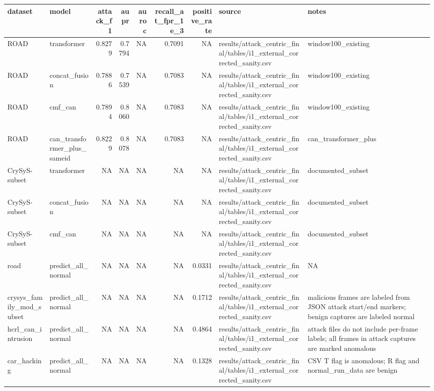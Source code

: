 \begin{tabular}{llrrrrrll}
\toprule
dataset & model & attack\_f1 & aupr & auroc & recall\_at\_fpr\_1e\_3 & positive\_rate & source & notes \\
\midrule
ROAD & transformer & 0.8279 & 0.7794 & NA & 0.7091 & NA & results/attack\_centric\_final/tables/i1\_external\_corrected\_sanity.csv & window100\_existing \\
ROAD & concat\_fusion & 0.7886 & 0.7539 & NA & 0.7083 & NA & results/attack\_centric\_final/tables/i1\_external\_corrected\_sanity.csv & window100\_existing \\
ROAD & cmf\_can & 0.7894 & 0.8060 & NA & 0.7083 & NA & results/attack\_centric\_final/tables/i1\_external\_corrected\_sanity.csv & window100\_existing \\
ROAD & can\_transformer\_plus\_sameid & 0.8229 & 0.8078 & NA & 0.7083 & NA & results/attack\_centric\_final/tables/i1\_external\_corrected\_sanity.csv & can\_transformer\_plus \\
CrySyS-subset & transformer & NA & NA & NA & NA & NA & results/attack\_centric\_final/tables/i1\_external\_corrected\_sanity.csv & documented\_subset \\
CrySyS-subset & concat\_fusion & NA & NA & NA & NA & NA & results/attack\_centric\_final/tables/i1\_external\_corrected\_sanity.csv & documented\_subset \\
CrySyS-subset & cmf\_can & NA & NA & NA & NA & NA & results/attack\_centric\_final/tables/i1\_external\_corrected\_sanity.csv & documented\_subset \\
road & predict\_all\_normal & NA & NA & NA & NA & 0.0331 & results/attack\_centric\_final/tables/i1\_external\_corrected\_sanity.csv & NA \\
crysys\_family\_mod\_subset & predict\_all\_normal & NA & NA & NA & NA & 0.1712 & results/attack\_centric\_final/tables/i1\_external\_corrected\_sanity.csv & malicious frames are labeled from JSON attack start/end markers; benign captures are labeled normal \\
hcrl\_can\_intrusion & predict\_all\_normal & NA & NA & NA & NA & 0.4864 & results/attack\_centric\_final/tables/i1\_external\_corrected\_sanity.csv & attack files do not include per-frame labels; all frames in attack captures are marked anomalous \\
car\_hacking & predict\_all\_normal & NA & NA & NA & NA & 0.1328 & results/attack\_centric\_final/tables/i1\_external\_corrected\_sanity.csv & CSV T flag is anomalous; R flag and normal\_run\_data are benign \\

\end{tabular}
